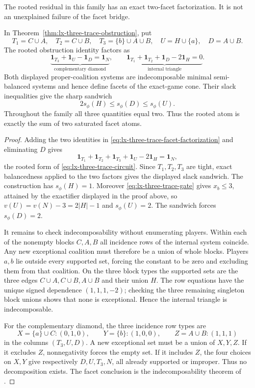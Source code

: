 The rooted residual in this family has an exact two-facet factorization.  It
is not an unexplained failure of the facet bridge.

\begin{theorem}
\label{thm:lx-three-trace-facet-factorization}
In Theorem~\ref{thm:lx-three-trace-obstruction}, put
\[
 T_1=C\cup A,\quad T_2=C\cup B,\quad
 T_3=\{b\}\cup A\cup B,\quad U=H\cup\{a\},\quad D=A\cup B.
\]
The rooted obstruction identity factors as
\[
 \underbrace{\mathbf1_{T_3}+\mathbf1_U-\mathbf1_D
              =\mathbf1_N}_{\text{complementary diamond}},
 \qquad
 \underbrace{\mathbf1_{T_1}+\mathbf1_{T_2}+\mathbf1_D
              -2\mathbf1_H=0}_{\text{internal triangle}}.       \tag{TF}
 \label{eq:lx-three-trace-facet-factorization}
\]
Both displayed proper-coalition systems are indecomposable minimal
semi-balanced systems and hence define facets of the exact-game cone.  Their
slack inequalities give the sharp sandwich
\[
 2s_\phi(H)\leq s_\phi(D)\leq s_\phi(U).
\]
Throughout the family all three quantities equal two.  Thus the rooted atom
is exactly the sum of two saturated facet atoms.
\end{theorem}

\begin{proof}
Adding the two identities in \eqref{eq:lx-three-trace-facet-factorization}
and eliminating $D$ gives
\[
 \mathbf1_{T_1}+\mathbf1_{T_2}+\mathbf1_{T_3}+\mathbf1_U
 -2\mathbf1_H=\mathbf1_N,
\]
the rooted form of \eqref{eq:lx-three-trace-circuit}.  Since $T_1,T_2,T_3$
are tight, exact balancedness applied to the two factors gives the displayed
slack sandwich.  The construction has $s_\phi(H)=1$.  Moreover
\eqref{eq:lx-three-trace-gate} gives $x_b\leq3$, attained by the exactifier
displayed in the proof above, so
$v(U)=v(N)-3=2|H|-1$ and $s_\phi(U)=2$.  The sandwich forces
$s_\phi(D)=2$.

It remains to check indecomposability without enumerating players.  Within
each of the nonempty blocks $C,A,B$ all incidence rows of the internal
system coincide.  Any new exceptional coalition must therefore be a union
of whole blocks.  Players $a,b$ lie outside every supported set, forcing the
constant to be zero and excluding them from that coalition.  On the three
block types the supported sets are the three edges
$C\cup A,C\cup B,A\cup B$ and their union $H$.  The row equations have the
unique signed dependence $(1,1,1,-2)$; checking the three remaining singleton
block unions shows that none is exceptional.  Hence the internal triangle is
indecomposable.

For the complementary diamond, the three incidence row types are
\[
 X=\{a\}\cup C:(0,1,0),\qquad
 Y=\{b\}:(1,0,0),\qquad
 Z=A\cup B:(1,1,1)
\]
in the columns $(T_3,U,D)$.  A new exceptional set must be a union of
$X,Y,Z$.  If it excludes $Z$, nonnegativity forces the empty set.  If it
includes $Z$, the four choices on $X,Y$ give respectively
$D,U,T_3,N$, all already supported or improper.  Thus no decomposition
exists.  The facet conclusion is the indecomposability theorem of
\citet{StudenyKratochvil2022}.
\end{proof}

